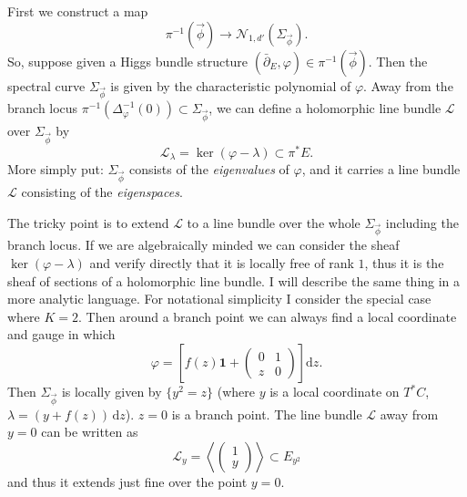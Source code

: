 \documentclass[12pt,letterpaper,reqno]{article}
\numberwithin{equation}{section}
\newcommand{\cL}{\ensuremath{\mathcal L}}
\newcommand{\cN}{\ensuremath{\mathcal N}}
\newcommand\bid{{\mathbf 1}}
\newcommand{\de}{\mathrm{d}}
\newcommand{\ti}[1]{\textit{#1}}
\begin{document}
\begin{pf} First we construct a map
\begin{equation}
  \pi^{-1}(\vec\phi) \to \cN_{1,d'}(\Sigma_{\vec\phi}).
\end{equation}
So, suppose given a Higgs bundle structure
$(\bar\partial_E,\varphi) \in \pi^{-1}(\vec\phi)$.
Then the spectral
curve $\Sigma_{\vec\phi}$ is given by the characteristic polynomial
of $\varphi$. Away from the branch locus
 $\pi^{-1}(\Delta_\varphi^{-1}(0)) \subset \Sigma_{\vec\phi}$, we can
define a holomorphic line bundle $\cL$ over $\Sigma_{\vec\phi}$ by
\begin{equation}
 \cL_\lambda = \ker(\varphi - \lambda) \subset \pi^* E.
\end{equation}
More simply put:
$\Sigma_{\vec\phi}$ consists of the \ti{eigenvalues} of $\varphi$,
and it carries a line bundle $\cL$ consisting of the \ti{eigenspaces}.

The tricky point is to extend
$\cL$ to a line bundle over the whole $\Sigma_{\vec\phi}$
including the branch locus.
If we are algebraically minded we can consider the
sheaf $\ker(\varphi-\lambda)$ and verify directly that it is
locally free of rank $1$, thus it is the sheaf of sections of a
holomorphic line bundle. I will describe the same thing in a more
analytic language. For notational simplicity I consider the special case
where $K=2$. Then around a branch point
we can always find a local coordinate and gauge in which
\begin{equation}
   \varphi = \left[f(z) \bid + \begin{pmatrix} 0 & 1 \\ z & 0 \end{pmatrix}\right] \de z.
\end{equation}
Then $\Sigma_{\vec\phi}$ is locally
given by $\{y^2 = z\}$ (where $y$ is a local coordinate on $T^*C$, $\lambda = (y+f(z)) \, \de z$). $z = 0$ is a branch point.
The line bundle $\cL$ away from $y=0$ can be written as
\begin{equation}
  \cL_y = \left\langle   \begin{pmatrix} 1 \\ y  \end{pmatrix}
\right\rangle  \subset E_{y^2}
\end{equation}
and thus it extends just fine over the point $y=0$.


\end{pf}
\end{document}
